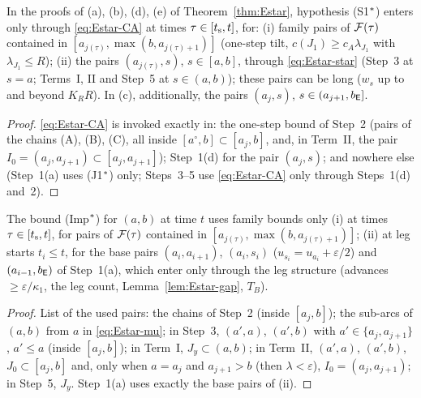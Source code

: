 \begin{lemma}\label{lem:Estar-L1}
In the proofs of (a), (b), (d), (e) of Theorem~\ref{thm:Estar}, hypothesis (S1$^{*}$) enters only through \eqref{eq:Estar-CA} at
times $\tau\in[t_{\mathrm s},t]$, for: (i) family pairs of $\mathcal F(\tau)$ contained in $[a_{j(\tau)},\max(b,a_{j(\tau)+1})]$ (one-step tilt,
$c(J_1)\ge c_A\lambda_{J_1}$ with $\lambda_{J_1}\le R$); (ii) the pairs $(a_{j(\tau)},s)$, $s\in[a,b]$, through \eqref{eq:Estar-star}
(Step~3 at $s=a$; Terms~I, II and Step~5 at $s\in(a,b)$); these pairs can be long ($w_s$ up to and beyond $K_RR$). In (c),
additionally, the pairs $(a_j,s)$, $s\in(a_{j+1},b_{\mathsf E}]$.
\end{lemma}
\begin{proof}
\eqref{eq:Estar-CA} is invoked exactly in: the one-step bound of Step~2 (pairs of the chains (A), (B), (C), all inside
$[a^\circ,b]\subset[a_j,b]$, and, in Term~II, the pair $I_0=(a_j,a_{j+1})\subset[a_j,a_{j+1}]$); Step~1(d) for the pair $(a_j,s)$;
and nowhere else (Step~1(a) uses (J1$^{*}$) only; Steps~3--5 use \eqref{eq:Estar-CA} only through Steps~1(d) and~2).
\end{proof}

\begin{lemma}[Localisation]\label{lem:Estar-L2}
The bound (Imp$^{*}$) for $(a,b)$ at time $t$ uses family bounds only (i) at times $\tau\in[t_{\mathrm s},t]$, for pairs of $\mathcal F(\tau)$
contained in $[a_{j(\tau)},\max(b,a_{j(\tau)+1})]$; (ii) at leg starts $t_i\le t$, for the base pairs $(a_i,a_{i+1})$, $(a_i,s_i)$
($u_{s_i}=u_{a_i}+\varepsilon/2$) and $(a_{i-1},b_{\mathsf E})$ of Step~1(a), which enter only through the leg structure (advances
$\ge\varepsilon/\kappa_1$, the leg count, Lemma~\ref{lem:Estar-gap}, $T_B$).
\end{lemma}
\begin{proof}
List of the used pairs: the chains of Step~2 (inside $[a_j,b]$); the sub-arcs of $(a,b)$ from $a$ in \eqref{eq:Estar-mu}; in Step~3,
$(a',a)$, $(a',b)$ with $a'\in\{a_j,a_{j+1}\}$, $a'\le a$ (inside $[a_j,b]$); in Term~I, $J_y\subset(a,b)$; in Term~II, $(a',a)$,
$(a',b)$, $J_0\subset[a_j,b]$ and, only when $a=a_j$ and $a_{j+1}>b$ (then $\lambda<\varepsilon$), $I_0=(a_j,a_{j+1})$; in Step~5,
$J_y$. Step~1(a) uses exactly the base pairs of (ii).
\end{proof}

